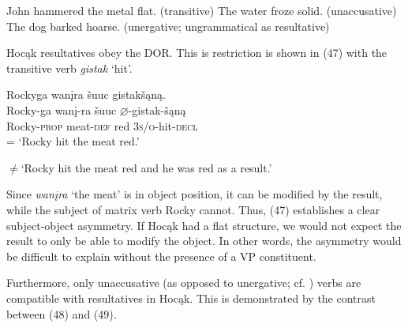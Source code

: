 \documentclass[output=paper]{LSP/langsci}
\begin{document}
\begin{exe}
\ex
\begin{xlist}
\ex John hammered the metal flat.	(transitive)
\ex The water froze solid.						(unaccusative)
\ex *The dog barked hoarse.	(unergative; ungrammatical as resultative)
\end{xlist}
\end{exe}
	
Hocąk resultatives obey the DOR. This is restriction is shown in (47) with the transitive verb \textit{gistak} `hit'.

\begin{exe}
\ex 
\glll Rockyga			wan\k{i}ra			\v{s}uuc 		gistak\v{s}ąną.\\
Rocky-ga		wan\k{i}-ra		\v{s}uuc		$\varnothing$-gistak-\v{s}ąną \\
Rocky-\textsc{prop}	meat-\textsc{def}	red			\textsc{3s/o}-hit-\textsc{decl} \\
\trans = `Rocky hit the meat red.'

$\neq$`Rocky hit the meat red and he was red as a result.'
\end{exe}

Since \textit{wan\k{i}ra} `the meat' is in object position, it can be modified by the result, while the subject of matrix verb Rocky cannot. Thus, (47) establishes a clear subject-object asymmetry. If Hocąk had a flat structure, we would not expect the result to only be able to modify the object. In other words, the asymmetry would be difficult to explain without the presence of a VP constituent.
	
Furthermore, only unaccusative (as opposed to unergative; cf. \citealt{Perlmutter1978}) verbs are compatible with resultatives in Hocąk. This is demonstrated by the contrast between (48) and (49).
\end{document}
